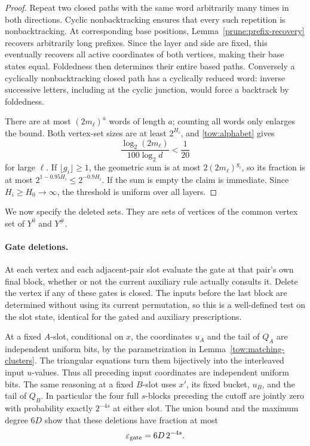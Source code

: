 \begin{proof}
Repeat two closed paths with the same word arbitrarily many times
in both directions.  Cyclic nonbacktracking ensures that every such
repetition is nonbacktracking.  At corresponding base positions,
Lemma~\ref{prune:prefix-recovery} recovers arbitrarily long prefixes.
Since the layer and side are fixed, this eventually recovers all
active coordinates of both vertices, making their base states equal.
Foldedness then determines their entire based paths.  Conversely a
cyclically nonbacktracking closed path has a cyclically reduced word:
inverse successive letters, including at the cyclic junction, would
force a backtrack by foldedness.

There are at most \((2m_\ell)^a\) words of length \(a\); counting
all words only enlarges the bound.  Both vertex-set sizes are at least
\(2^{H_i}\), and \eqref{tow:alphabet} gives
\[
 \frac{\log_2(2m_\ell)}{100\log_2 d}<\frac1{20}
\]
for large \(\ell\).  If \(\lfloor g_i\rfloor\geq1\), the
geometric sum is at most \(2(2m_\ell)^{g_i}\), so its fraction is
at most \(2^{1-0.95H_i}\leq2^{-0.9H_i}\).  If the sum is empty
the claim is immediate.  Since \(H_i\geq H_0\to\infty\), the
threshold is uniform over all layers.
\end{proof}

We now specify the deleted sets.  They are sets of vertices of the
common vertex set of \(Y^0\) and \(Y^\#\).

\paragraph{Gate deletions.}
At each vertex and each adjacent-pair slot evaluate the gate at that
pair's own final block, whether or not the current auxiliary rule
actually consults it.  Delete the vertex if any of these gates is
closed.  The inputs before the last block are determined without
using its current permutation, so this is a well-defined test on the
slot state, identical for the gated and auxiliary prescriptions.

At a fixed \(A\)-slot, conditional on \(x\), the coordinates
\(u_A\) and the tail of \(Q_A\) are independent uniform bits,
by the parametrization in Lemma~\ref{tow:matching-clusters}.
The triangular equations turn them bijectively into the interleaved
input \(u\)-values.  Thus all preceding input coordinates are
independent uniform bits.  The same reasoning at a fixed \(B\)-slot
uses \(x'\), its fixed bucket, \(u_B\), and the tail of \(Q_B\).
In particular the four full \(s\)-blocks preceding the cutoff are
jointly zero with probability exactly \(2^{-4s}\) at either slot.
The union bound and the maximum degree \(6D\) show that these
deletions have fraction at most
\begin{equation}
 \varepsilon_{\rm gate}=6D\,2^{-4s}.
 \label{prune:gate-budget}
\end{equation}

